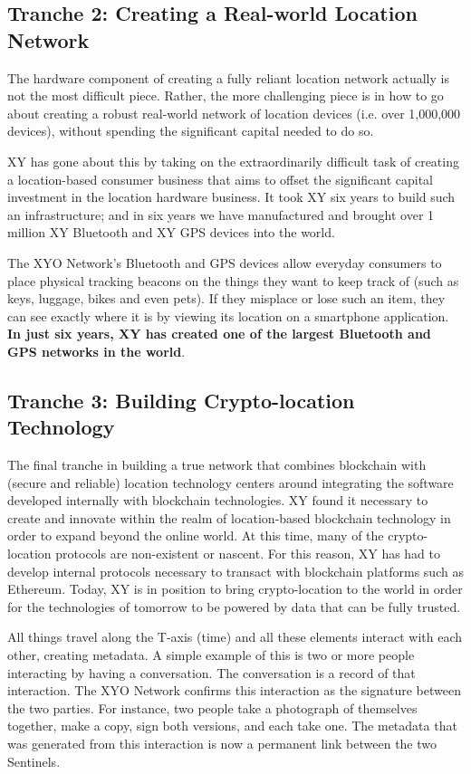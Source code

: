 \documentclass{article}
\begin{document}
\subsection{Tranche 2: Creating a Real-world Location Network}
The hardware component of creating a fully reliant location network actually is not the most difficult piece. Rather, the more challenging piece is in how to go about creating a robust real-world network of location devices (i.e. over 1,000,000 devices), without spending the  significant capital needed to do so.

XY has gone about this by taking on the extraordinarily difficult task of creating a location-based consumer business that aims to offset the significant capital investment in the location hardware business. It took XY six years to build such an infrastructure; and in six years we have manufactured and brought over 1 million XY Bluetooth and XY GPS devices into the world.

The XYO Network's Bluetooth and GPS devices allow everyday consumers to place physical tracking beacons on the things they want to keep track of (such as keys, luggage, bikes and even pets). If they misplace or lose such an item, they can see exactly where it is by viewing its location on a smartphone application. \textbf{In just six years, XY has created one of the largest Bluetooth and GPS networks in the world}.

\subsection{Tranche 3: Building Crypto-location Technology}
The final tranche in building a true network that combines blockchain with (secure and reliable) location technology centers around integrating the software developed internally with blockchain technologies. XY found it necessary to create and innovate within the realm of location-based blockchain technology in order to expand beyond the online world. At this time, many of the crypto-location protocols are non-existent or nascent. For this reason, XY has had to develop internal protocols necessary to transact with blockchain platforms such as Ethereum. Today, XY is in position to bring crypto-location to the world in order for the technologies of tomorrow to be powered by data that can be fully trusted.


All things travel along the T-axis (time) and all these elements interact with each other, creating metadata. A simple example of this is two or more people interacting by having a conversation. The conversation is a record of that interaction. The XYO Network confirms this interaction as the signature between the two parties. For instance, two people take a photograph of themselves together, make a copy, sign both versions, and each take one. The metadata that was generated from this interaction is now a permanent link between the two Sentinels.
\end{document}
